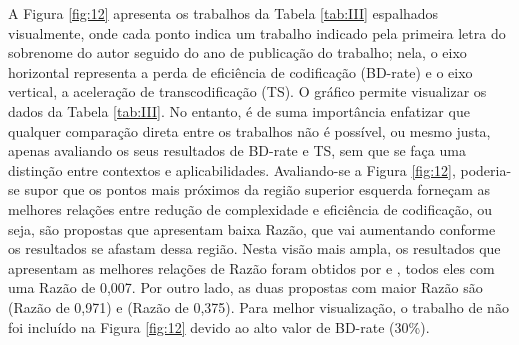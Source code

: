 A Figura \ref{fig:12} apresenta os trabalhos da Tabela \ref{tab:III} espalhados visualmente, onde cada ponto indica um trabalho indicado pela primeira letra do sobrenome do autor seguido do ano de publicação do trabalho; nela, o eixo horizontal representa a perda de eficiência de codificação (BD-rate) e o eixo vertical, a aceleração de transcodificação (TS). O gráfico permite visualizar os dados da Tabela \ref{tab:III}. No entanto, é de suma importância enfatizar que qualquer comparação direta entre os trabalhos não é possível, ou mesmo justa, apenas avaliando os seus resultados de BD-rate e TS, sem que se faça uma distinção entre contextos e aplicabilidades. Avaliando-se a Figura \ref{fig:12}, poderia-se supor que os pontos mais próximos da região superior esquerda forneçam as melhores relações entre redução de complexidade e eficiência de codificação, ou seja, são propostas que apresentam baixa Razão, que vai aumentando conforme os resultados se afastam dessa região. Nesta visão mais ampla, os resultados que apresentam as melhores relações de Razão foram obtidos por \citet{bib:jin_2011} e \citet{bib:grellert_2018}, todos eles com uma Razão de 0,007. Por outro lado, as duas propostas com maior Razão são \citet{bib:aminlou_2016} (Razão de 0,971) e \citet{bib:zhang_2012} (Razão de 0,375). Para melhor visualização, o trabalho de \citet{bib:zhang_2012} não foi incluído na Figura \ref{fig:12} devido ao alto valor de BD-rate (30\%).



